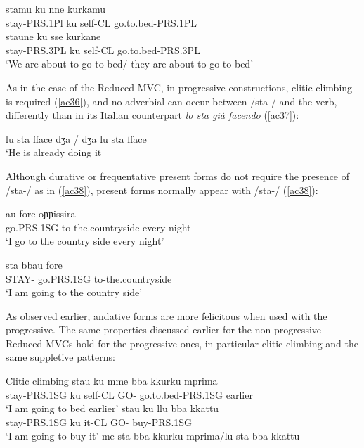 \documentclass[output=paper]{langscibook}
\begin{document}
\ea\label{ac35}
    \ea \label{ac35a}\gll stamu      ku  nne     kurkamu\\
    stay-PRS.1Pl ku self-CL  go.to.bed-PRS.1PL\\ 
    \ex \label{ac35b}\gll staune      ku  sse     kurkane\\
    stay-PRS.3PL ku self-CL  go.to.bed-PRS.3PL\\
    \glt ‘We are about to go to bed/ they are about to go to bed’
    \z
\z

As in the case of the Reduced MVC, in progressive constructions, clitic climbing is required (\ref{ac36}), and no adverbial can occur between /sta-/ and the verb, differently than in its Italian counterpart \textit{lo sta già facendo} (\ref{ac37}):

\ea\label{ac36}
    \z
\z

\ea\label{ac37}
    \ex \label{ac37b}lu sta fface dʒa / dʒa lu sta fface\\
     ‘He is already doing it
    \z
\z

Although durative or frequentative present forms do not require the presence of /sta-/ as in (\ref{ac38}), present forms normally appear with /sta-/ (\ref{ac38}):

\ea \label{ac38}\gll  au        fore         oɲɲissira\\
   go.PRS.1SG  to-the.countryside every night\\
 \glt  ‘I go to the country side every night’
\z

\ea \label{ac39}\gll sta    bbau       fore\\
   STAY- go.PRS.1SG  to-the.countryside \\
\glt   ‘I am going to the country side’
\z

As observed earlier, andative forms are more felicitous when used with the progressive. The same properties discussed earlier for the non-progressive Reduced MVCs hold for the progressive ones, in particular clitic climbing and the same suppletive patterns:

\ea \label{ac40}Clitic climbing 
    \ea \label{ac40a}
        \ea \gll stau       ku  mme   bba  kkurku      mprima\\
      stay-PRS.1SG ku self-CL  GO- go.to.bed-PRS.1SG earlier\\
      \glt ‘I am going to bed earlier’
        \ex \gll stau       ku   llu   bba   kkattu\\
      stay-PRS.1SG  ku   it-CL  GO-  buy-PRS.1SG\\
      \glt ‘I am going to buy it’
        \z
    \ex \label{ac40b}me sta bba kkurku mprima/lu sta bba kkattu
    \z
\z
\end{document}
